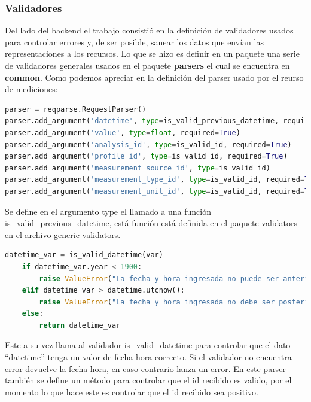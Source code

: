 \documentclass[a4paper,12pt]{article}
\begin{document}

\subsubsection{Validadores}
Del lado del backend el trabajo consistió en la definición de validadores usados para controlar errores y, de ser posible, sanear los datos que envían las representaciones a los recursos. Lo que se hizo es definir en un paquete una serie de validadores generales usados en el paquete \textbf{parsers} el cual se encuentra en \textbf{common}. Como podemos apreciar en la definición del parser usado por el reurso de mediciones:

\begin{lstlisting}[language=Python]
parser = reqparse.RequestParser()
parser.add_argument('datetime', type=is_valid_previous_datetime, required=True)
parser.add_argument('value', type=float, required=True)
parser.add_argument('analysis_id', type=is_valid_id, required=True)
parser.add_argument('profile_id', type=is_valid_id, required=True)
parser.add_argument('measurement_source_id', type=is_valid_id)
parser.add_argument('measurement_type_id', type=is_valid_id, required=True)
parser.add_argument('measurement_unit_id', type=is_valid_id, required=True)
\end{lstlisting}

Se define en el argumento type el llamado a una función is\_valid\_previous\_datetime, está función está definida en el paquete validators en el archivo generic validators.

\begin{lstlisting}[language=Python]
    datetime_var = is_valid_datetime(var)
    if datetime_var.year < 1900:
        raise ValueError("La fecha y hora ingresada no puede ser anterior al anio 1900.")
    elif datetime_var > datetime.utcnow():
        raise ValueError("La fecha y hora ingresada no debe ser posterior a la fecha y hora actual.")
    else:
        return datetime_var
\end{lstlisting}

Este a su vez llama al validador is\_valid\_datetime para controlar que el dato ``datetime'' tenga un valor de fecha-hora correcto. Si el validador no encuentra error devuelve la fecha-hora, en caso contrario lanza un error.
En este parser también se define un método para controlar que el id recibido es valido, por el momento lo que hace este es controlar que el id recibido sea positivo.

\end{document}
